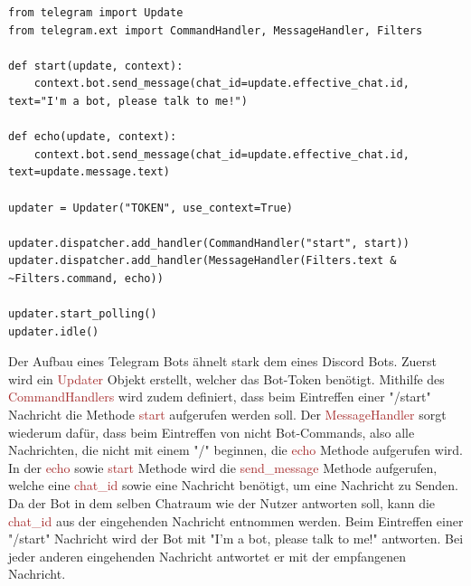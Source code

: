 \documentclass[sigplan,screen]{acmart}
\begin{document}
\begin{lstlisting}
from telegram import Update
from telegram.ext import CommandHandler, MessageHandler, Filters

def start(update, context):
    context.bot.send_message(chat_id=update.effective_chat.id, text="I'm a bot, please talk to me!")

def echo(update, context):
    context.bot.send_message(chat_id=update.effective_chat.id, text=update.message.text)

updater = Updater("TOKEN", use_context=True)

updater.dispatcher.add_handler(CommandHandler("start", start))
updater.dispatcher.add_handler(MessageHandler(Filters.text & ~Filters.command, echo))

updater.start_polling()
updater.idle()
\end{lstlisting} 
Der Aufbau eines Telegram Bots ähnelt stark dem eines Discord Bots. 
Zuerst wird ein \textcolor{brown}{Updater} Objekt erstellt, welcher das Bot-Token benötigt. Mithilfe des \textcolor{brown}{CommandHandlers} wird zudem definiert, dass beim Eintreffen einer "/start" Nachricht die Methode \textcolor{brown}{start} aufgerufen werden soll. Der \textcolor{brown}{MessageHandler} sorgt wiederum dafür, dass beim Eintreffen von nicht Bot-Commands, also alle Nachrichten, die nicht mit einem "/" beginnen, die \textcolor{brown}{echo} Methode aufgerufen wird. In der \textcolor{brown}{echo} sowie \textcolor{brown}{start} Methode wird die \textcolor{brown}{send\_message} Methode aufgerufen, welche eine \textcolor{brown}{chat\_id}  sowie eine Nachricht benötigt, um eine Nachricht zu Senden. Da der Bot in dem selben Chatraum wie der Nutzer antworten soll, kann die \textcolor{brown}{chat\_id} aus der eingehenden Nachricht entnommen werden. Beim Eintreffen einer "/start" Nachricht wird der Bot mit "I'm a bot, please talk to me!" antworten. Bei jeder anderen eingehenden Nachricht antwortet er mit der empfangenen Nachricht. \cite{tele3}
\end{document}
